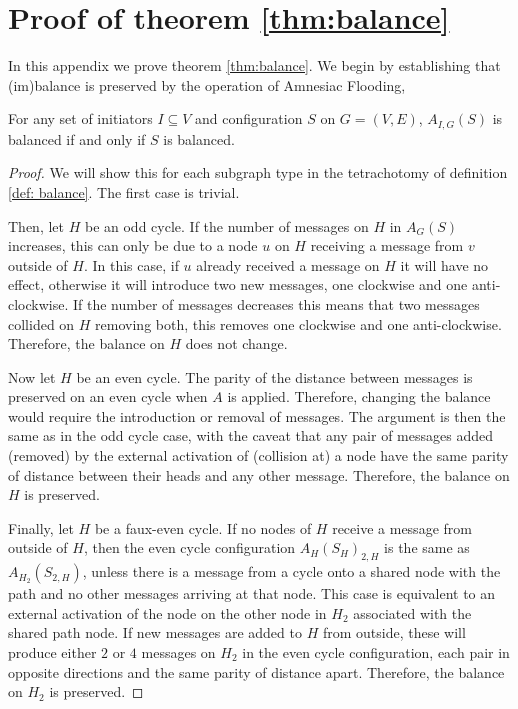 \section{Proof of theorem \ref{thm:balance}}
    \label{apx: balance}
    In this appendix we prove theorem \cref{thm:balance}. We begin by establishing that (im)balance is preserved by the operation of Amnesiac Flooding,
    \begin{lemma}
        For any set of initiators $I\subseteq V$ and configuration $S$ on $G=(V,E)$, $A_{I,G}(S)$ is balanced if and only if $S$ is balanced.
    \end{lemma}
    \begin{proof}
        We will show this for each subgraph type in the tetrachotomy of definition \ref{def: balance}. The first case is trivial. 
        
        Then, let $H$ be an odd cycle. If the number of messages on $H$ in $A_G(S)$ increases, this can only be due to a node $u$ on $H$ receiving a message from $v$ outside of $H$. In this case, if $u$ already received a message on $H$ it will have no effect, otherwise it will introduce two new messages, one clockwise and one anti-clockwise. If the number of messages decreases this means that two messages collided on $H$ removing both, this removes one clockwise and one anti-clockwise. Therefore, the balance on $H$ does not change.

        Now let $H$ be an even cycle. The parity of the distance between messages is preserved on an even cycle when $A$ is applied. Therefore, changing the balance would require the introduction or removal of messages. The argument is then the same as in the odd cycle case, with the caveat that any pair of messages added (removed) by the external activation of (collision at) a node have the same parity of distance between their heads and any other message. Therefore, the balance on $H$ is preserved.

        Finally, let $H$ be a faux-even cycle. If no nodes of $H$ receive a message from outside of $H$, then the even cycle configuration $A_H(S_H)_{2,H}$ is the same as $A_{H_2}(S_{2,H})$, unless there is a message from a cycle onto a shared node with the path and no other messages arriving at that node. This case is equivalent to an external activation of the node on the other node in $H_2$ associated with the shared path node. If new messages are added to $H$ from outside, these will produce either $2$ or $4$ messages on $H_2$ in the even cycle configuration, each pair in opposite directions and the same parity of distance apart. Therefore, the balance on $H_2$ is preserved.
    \end{proof}

